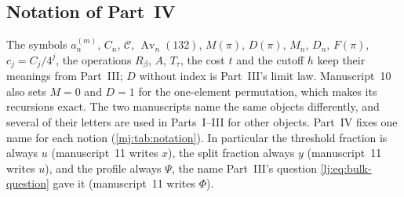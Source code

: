 \documentclass[11pt,a4paper]{article}
\theoremstyle{definition}\newaliascnt{definition}{theorem}
\theoremstyle{remark}\newaliascnt{remark}{theorem}
\newcommand{\Av}{\operatorname{Av}}
\newcommand{\Cat}{\mathcal C}
\begin{document}
\subsection{Notation of Part~IV}
\label{mj:sec:notation}
The symbols $a_n^{(m)}$, $C_n$, $\Cat$, $\Av_n(132)$, $M(\pi)$, $D(\pi)$,
$M_n$, $D_n$, $F(\pi)$, $c_j=C_j/4^j$, the operations $R_\beta$, $A$,
$T_\tau$, the cost $t$ and the cutoff $h$ keep their meanings from Part~III;
$D$ without index is Part~III's limit law. Manuscript~10 also sets $M=0$ and
$D=1$ for the one-element permutation, which makes its recursions exact.
The two manuscripts name the same objects differently, and several of their
letters are used in Parts~I--III for other objects. Part~IV fixes one name
for each notion (\cref{mj:tab:notation}). In particular the threshold
fraction is always $u$ (manuscript~11 writes $x$), the split fraction always
$y$ (manuscript~11 writes $u$), and the profile always $\Psi$, the name
Part~III's question \eqref{lj:eq:bulk-question} gave it (manuscript~11
writes $\Phi$).
\end{document}
